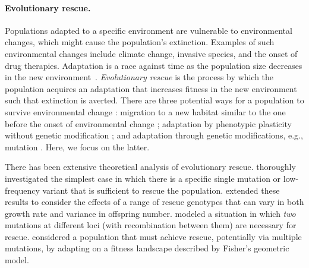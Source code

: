 \documentclass[12pt]{extarticle}
\begin{document}
\paragraph{Evolutionary rescue.} Populations adapted to a specific environment are vulnerable to environmental changes, which might cause the population's extinction. Examples of such environmental changes include climate change, invasive species, and the onset of drug therapies. Adaptation is a race against time as the population size decreases in the new environment~\citep{tanaka2022surviving}. 
\emph{Evolutionary rescue} is the process by which the population acquires an adaptation that increases fitness in the new environment such that extinction is averted.
There are three potential ways for a population to survive environmental change \citep{alexander2014evolutionary,bell2017evolutionary}: %
migration to a new habitat similar to the one before the onset of environmental change \citep{harsch2014keeping,cobbold2020should,zhou2022range}; 
adaptation by phenotypic plasticity without genetic modification \citep{carja2019evolutionary,carja2017evolutionary,levien2021non,gunnarsson2020understanding}; 
and adaptation through genetic modifications, e.g., mutation \citep{gomulkiewicz1995does,uecker2014evolutionary,uecker2016role,uecker2011fixation,orr2014population}. 
Here, we focus on the latter. 

There has been extensive theoretical analysis of evolutionary rescue.
\citet{orr2008population,orr2014population} thoroughly investigated the simplest case in which there is a specific single mutation or low-frequency variant that is sufficient to rescue the population. 
\citet{martin2013probability} extended these results to consider the effects of a range of rescue genotypes that can vary in both growth rate and variance in offspring number.
\citep{uecker2016role} modeled a situation in which \textit{two} mutations at different loci (with recombination between them) are necessary for rescue. 
\citet{osmond2020genetic} considered a population that must achieve rescue, potentially via multiple mutations, by adapting on a fitness landscape described by Fisher's geometric model. 
\end{document}
